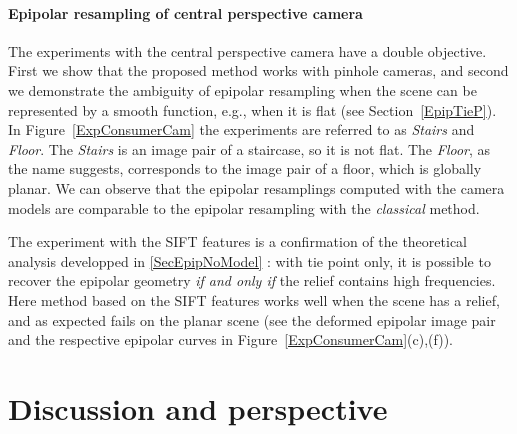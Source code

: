 \documentclass{ipol}
\begin{document}

\paragraph{Epipolar resampling of central perspective camera}
%
The experiments with the central perspective camera have a double objective. First we show that the proposed method works with pinhole cameras, and second we demonstrate the ambiguity of epipolar resampling when the scene can be represented by a smooth function, e.g., when it is flat (see Section~\ref{EpipTieP}). In Figure~\ref{ExpConsumerCam} the experiments are referred to as \textit{Stairs} and \textit{Floor}. The \textit{Stairs} is an image pair of a staircase, so it is not flat. The \textit{Floor}, as the name suggests, corresponds to the image pair of a floor, which is globally planar. We can observe that the epipolar resamplings computed with the camera models are comparable to the epipolar resampling with the \textit{classical} method. 

The experiment with the SIFT features  is a confirmation of the theoretical analysis developped in \ref{SecEpipNoModel} :  with tie point only, it is possible to recover the epipolar geometry  \emph{if and only if} the relief contains high frequencies. Here method based on the SIFT features works well when the scene has a relief, and as expected fails on the planar scene (see the deformed epipolar image pair and the respective epipolar curves in Figure~\ref{ExpConsumerCam}(c),(f)).

 
\section{Discussion and perspective}
%
\end{document}
